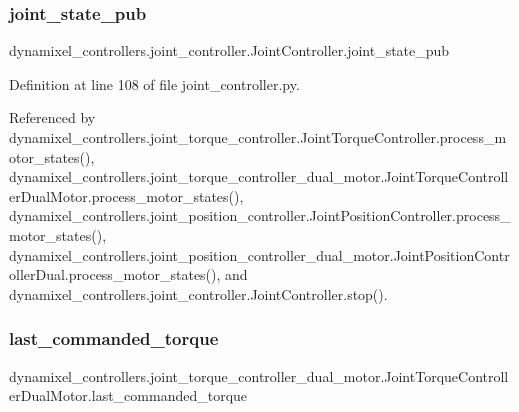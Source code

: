 \subsubsection{\texorpdfstring{joint\+\_\+state\+\_\+pub}{joint\_state\_pub}}
{\footnotesize\ttfamily dynamixel\+\_\+controllers.\+joint\+\_\+controller.\+Joint\+Controller.\+joint\+\_\+state\+\_\+pub\hspace{0.3cm}{\ttfamily [inherited]}}



Definition at line 108 of file joint\+\_\+controller.\+py.



Referenced by dynamixel\+\_\+controllers.\+joint\+\_\+torque\+\_\+controller.\+Joint\+Torque\+Controller.\+process\+\_\+motor\+\_\+states(), dynamixel\+\_\+controllers.\+joint\+\_\+torque\+\_\+controller\+\_\+dual\+\_\+motor.\+Joint\+Torque\+Controller\+Dual\+Motor.\+process\+\_\+motor\+\_\+states(), dynamixel\+\_\+controllers.\+joint\+\_\+position\+\_\+controller.\+Joint\+Position\+Controller.\+process\+\_\+motor\+\_\+states(), dynamixel\+\_\+controllers.\+joint\+\_\+position\+\_\+controller\+\_\+dual\+\_\+motor.\+Joint\+Position\+Controller\+Dual.\+process\+\_\+motor\+\_\+states(), and dynamixel\+\_\+controllers.\+joint\+\_\+controller.\+Joint\+Controller.\+stop().

\mbox{\label{classdynamixel__controllers_1_1joint__torque__controller__dual__motor_1_1_joint_torque_controller_dual_motor_a68971e4badfe2c0f4883fa29870dbdbe}} 
\subsubsection{\texorpdfstring{last\+\_\+commanded\+\_\+torque}{last\_commanded\_torque}}
{\footnotesize\ttfamily dynamixel\+\_\+controllers.\+joint\+\_\+torque\+\_\+controller\+\_\+dual\+\_\+motor.\+Joint\+Torque\+Controller\+Dual\+Motor.\+last\+\_\+commanded\+\_\+torque}



